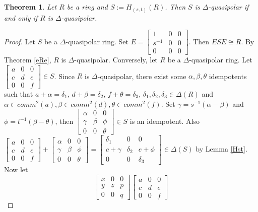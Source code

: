 \documentclass[12pt, reqno]{amsart}
\newtheorem{thm}{Theorem}[section]
\numberwithin{equation}{section}
\begin{document}
\begin{thm}
    Let $R$ be a ring and $S:=H_{(s,t)}(R)$. Then $S$ is $\Delta$-quasipolar if and only if $R$ is $\Delta$-quasipolar.
\end{thm}

\begin{proof}
    Let $S$ be a $\Delta$-quasipolar ring. Set $E=\begin{bmatrix}1&0&0\\s^{-1}&0&0\\0&0&0
\end{bmatrix}$. Then $ESE\cong R$. By Theorem \ref{eRe}, $R$ is $\Delta$-quasipolar. Conversely, let $R$ be a $\Delta$-quasipolar ring. Let $\begin{bmatrix}a&0&0\\c&d&e\\0&0&f
\end{bmatrix}\in S$. Since $R$ is $\Delta$-quasipolar, there exist some $\alpha,\beta, \theta$ idempotents such that $a+\alpha=\delta_1$, $d+\beta=\delta_2$, $f+\theta=\delta_3$, $\delta_1,\delta_2,\delta_3\in \Delta(R)$ and $\alpha\in comm^2(a),\beta\in comm^2(d),\theta \in comm^2(f)$. Set $\gamma=s^{-1}(\alpha-\beta)$ and $\phi=t^{-1}(\beta-\theta)$, then $\begin{bmatrix}\alpha&0&0\\\gamma&\beta&\phi\\0&0&\theta
\end{bmatrix} \in S$ is an idempotent. Also $\begin{bmatrix}a&0&0\\c&d&e\\0&0&f
\end{bmatrix}+\begin{bmatrix}\alpha&0&0\\\gamma&\beta&\phi\\0&0&\theta
\end{bmatrix}=\begin{bmatrix}\delta_1&0&0\\c+\gamma&\delta_2&e+\phi\\0&0&\delta_3
\end{bmatrix}\in \Delta(S)$ by Lemma \ref{Hst}. Now let $$\begin{bmatrix}x&0&0\\y&z&p\\0&0&q
\end{bmatrix}\begin{bmatrix}a&0&0\\c&d&e\\0&0&f

\end{bmatrix}$$
\end{proof}
\end{document}
